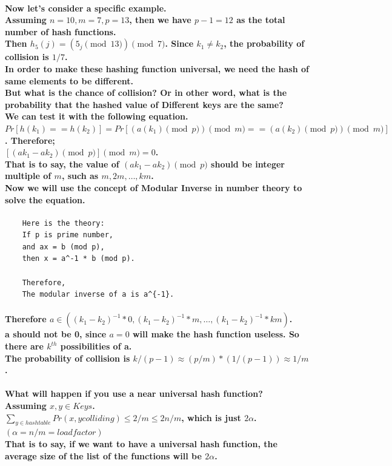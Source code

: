\documentclass{article}
\begin{document}
\paragraph{Now let's consider a specific example.\\
Assuming $n=10, m=7, p=13$, then we have $p-1 = 12$ as the total number of hash functions.\\
Then $h_5(j)=(5_j \pmod 13) \pmod 7$. Since $k_1 \neq k_2$, the probability of collision is $1/7$.\\
In order to make these hashing function universal, we need the hash of same elements to be different.\\
But what is the chance of collision? Or in other word, what is the probability that the hashed value of Different
keys are the same?\\
We can test it with the following equation.\\
$Pr[h(k_1) == h(k_2)] = Pr[(a(k_1) \pmod p) \pmod m == (a(k_2) \pmod p) \pmod m]$.
Therefore;\\
$[(ak_1 - ak_2) \pmod p] \pmod m = 0$. \\
That is to say, the value of $(ak_1 - ak_2) \pmod p$ should be integer multiple of $m$, such as $m,2m,\ldots, km$.\\
Now we will use the concept of Modular Inverse in number theory to solve the equation. \\}

\begin{verbatim}
    Here is the theory:
    If p is prime number,
    and ax = b (mod p),
    then x = a^-1 * b (mod p).

    Therefore,
    The modular inverse of a is a^{-1}.
\end{verbatim}

\paragraph{Therefore $a \in ((k_1-k_2)^{-1}*0, (k_1-k_2)^{-1}*m, \ldots, (k_1-k_2)^{-1}*km)$.\\
a should not be 0, since $a=0$ will make the hash function useless. So there are $k^{th}$ possibilities of a.\\
The probability of collision is $k/(p-1) \approx (p/m)*(1/(p-1)) \approx 1/m$.\\}

\paragraph{What will happen if you use a near universal hash function?\\
Assuming $x,y \in Keys$.\\
$\sum_{y \in hashtable}Pr(x, y colliding) \leq 2/m \leq 2n/m$, which is just $2\alpha$. $(\alpha=n/m=load factor)$\\
That is to say, if we want to have a universal hash function, the average size of the list of the functions will be $2\alpha$.\\}
\end{document}
